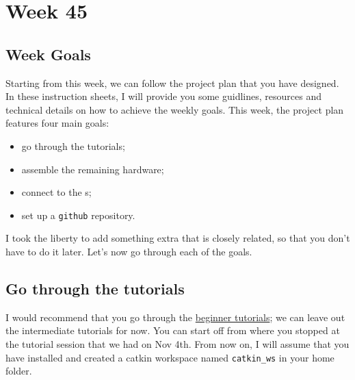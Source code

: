 \chapter*{Week 45}








\section*{Week Goals}

Starting from this week, we can follow the project plan that you have designed.
In these instruction sheets, I will provide you some guidlines, resources and technical details on how to achieve the weekly goals.
This week, the project plan features four main goals:
\begin{itemize}
\item go through the \ROS{} tutorials;
\item assemble the remaining hardware;
\item connect to the \CF{}s;
\item set up a \texttt{github} repository.
\end{itemize}
I took the liberty to add something extra that is closely related, so that you don't have to do it later.
Let's now go through each of the goals.








\section*{Go through the \ROS{} tutorials}

I would recommend that you go through the \href{http://wiki.ros.org/ROS/Tutorials#Beginner_Level}{beginner tutorials}; we can leave out the intermediate tutorials for now.
You can start off from where you stopped at the \ROS{} tutorial session that we had on Nov 4th.
From now on, I will assume that you have installed \ROS{} and created a catkin workspace named \lstinline|catkin_ws| in your home folder.






